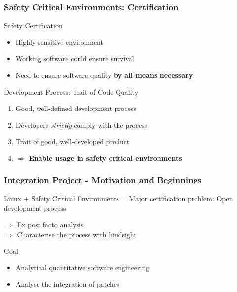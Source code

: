 \documentclass[12pt]{beamer}
\begin{document}
	\begin{frame}
	\frametitle{Safety Critical Environments: Certification}
		\begin{block}{Safety Certification}
			\begin{itemize}
				\item Highly sensitive environment
				\item Working software could ensure survival
				\item Need to ensure software quality \textbf{by all means necessary}
			\end{itemize}
		\end{block}
		\begin{block}{Development Process: Trait of Code Quality}
			\begin{enumerate}
				\item Good, well-defined development process\\ 
				\item Developers \textit{strictly} comply with the process\\
				\item Trait of good, well-developed product\\
				\item $\Rightarrow$ \textbf{Enable usage in safety critical environments}
			\end{enumerate}
		\end{block}

	\end{frame}

	\begin{frame}
	\frametitle{Integration Project - Motivation and Beginnings}
		\begin{block}{Linux + Safety Critical Environments}
			= Major certification problem: Open development process
		\end{block}
		$\Rightarrow$ Ex post facto analysis\\ 
		$\Rightarrow$ Characterise the process with hindsight

		\begin{alertblock}{Goal}
			\begin{itemize}
				\item Analytical quantitative software engineering
				\item Analyse the integration of patches
			\end{itemize}
		\end{alertblock}
	\end{frame}
\end{document}
